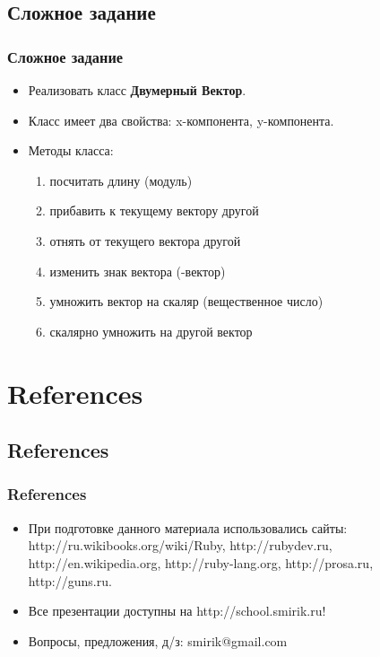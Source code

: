 \documentclass[compress,red]{beamer}
\begin{document}
\subsection{Сложное задание}
\begin{frame}[fragile]
  \frametitle{Сложное задание}
  \begin{itemize}
    \item Реализовать класс \textbf{Двумерный Вектор}. 
    \item Класс имеет два свойства: x-компонента, y-компонента. 
    \item Методы класса:
      \begin{enumerate}
        \item посчитать длину (модуль)
        \item прибавить к текущему вектору другой
        \item отнять от текущего вектора другой
        \item изменить знак вектора (-вектор)
        \item умножить вектор на скаляр (вещественное число)
        \item скалярно умножить на другой вектор
      \end{enumerate}
  \end{itemize}
\end{frame}

\section{References}
\subsection{References}
\begin{frame}[fragile]
  \frametitle{References}
  \begin{itemize}
    \item При подготовке данного материала использовались сайты: http://ru.wikibooks.org/wiki/Ruby, http://rubydev.ru, http://en.wikipedia.org, http://ruby-lang.org, http://prosa.ru, http://guns.ru.
    \item Все презентации доступны на http://school.smirik.ru!
    \item Вопросы, предложения, д/з: smirik@gmail.com
  \end{itemize}
\end{frame}
\end{document}
